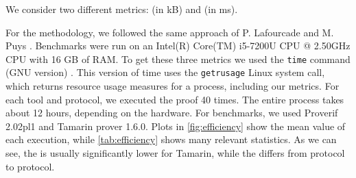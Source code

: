 We consider two different metrics: \textit{\mrss{}} (in kB) and \textit{\wct{}} (in ms).

For the methodology, we followed the same approach of P. Lafourcade and M. Puys \cite{lafourcade:hal-01306395}. Benchmarks were run on an Intel(R) Core(TM) i5-7200U CPU @ 2.50GHz CPU with 16 GB of RAM. To get these three metrics we used the \lstinline{time} command (GNU version) \cite{time_command}. This version of time uses the \lstinline{getrusage} Linux system call, which returns resource usage measures for a process, including our metrics. For each tool and protocol, we executed the proof 40 times. The entire process takes about 12 hours, depending on the hardware. For benchmarks, we used Proverif 2.02pl1 and Tamarin prover 1.6.0. Plots in \cref{fig:efficiency} show the mean value of each execution, while \cref{tab:efficiency} shows many relevant statistics. As we can see, the \mrss{} is usually significantly lower for Tamarin, while the \wct{} differs from protocol to protocol.

